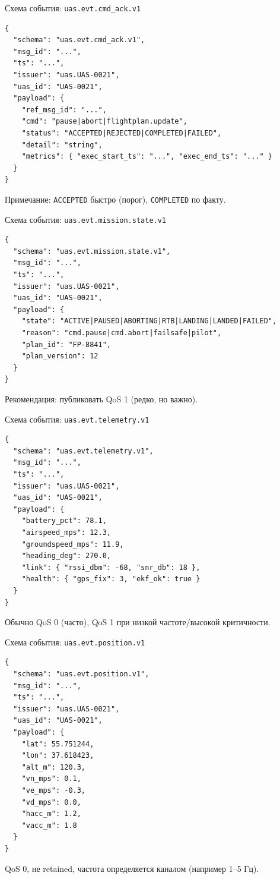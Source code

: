 \documentclass[aspectratio=169]{beamer}
\begin{document}
\begin{frame}{Схема события: \texttt{uas.evt.cmd\_ack.v1}}
\small
\begin{verbatim}
{
  "schema": "uas.evt.cmd_ack.v1",
  "msg_id": "...",
  "ts": "...",
  "issuer": "uas.UAS-0021",
  "uas_id": "UAS-0021",
  "payload": {
    "ref_msg_id": "...",
    "cmd": "pause|abort|flightplan.update",
    "status": "ACCEPTED|REJECTED|COMPLETED|FAILED",
    "detail": "string",
    "metrics": { "exec_start_ts": "...", "exec_end_ts": "..." }
  }
}
\end{verbatim}
Примечание: \texttt{ACCEPTED} быстро (порог), \texttt{COMPLETED} по факту.
\end{frame}

\begin{frame}{Схема события: \texttt{uas.evt.mission.state.v1}}
\small
\begin{verbatim}
{
  "schema": "uas.evt.mission.state.v1",
  "msg_id": "...",
  "ts": "...",
  "issuer": "uas.UAS-0021",
  "uas_id": "UAS-0021",
  "payload": {
    "state": "ACTIVE|PAUSED|ABORTING|RTB|LANDING|LANDED|FAILED",
    "reason": "cmd.pause|cmd.abort|failsafe|pilot",
    "plan_id": "FP-8841",
    "plan_version": 12
  }
}
\end{verbatim}
Рекомендация: публиковать QoS 1 (редко, но важно).
\end{frame}

\begin{frame}{Схема события: \texttt{uas.evt.telemetry.v1}}
\small
\begin{verbatim}
{
  "schema": "uas.evt.telemetry.v1",
  "msg_id": "...",
  "ts": "...",
  "issuer": "uas.UAS-0021",
  "uas_id": "UAS-0021",
  "payload": {
    "battery_pct": 78.1,
    "airspeed_mps": 12.3,
    "groundspeed_mps": 11.9,
    "heading_deg": 270.0,
    "link": { "rssi_dbm": -68, "snr_db": 18 },
    "health": { "gps_fix": 3, "ekf_ok": true }
  }
}
\end{verbatim}
Обычно QoS 0 (часто), QoS 1 при низкой частоте/высокой критичности.
\end{frame}

\begin{frame}{Схема события: \texttt{uas.evt.position.v1}}
\small
\begin{verbatim}
{
  "schema": "uas.evt.position.v1",
  "msg_id": "...",
  "ts": "...",
  "issuer": "uas.UAS-0021",
  "uas_id": "UAS-0021",
  "payload": {
    "lat": 55.751244,
    "lon": 37.618423,
    "alt_m": 120.3,
    "vn_mps": 0.1,
    "ve_mps": -0.3,
    "vd_mps": 0.0,
    "hacc_m": 1.2,
    "vacc_m": 1.8
  }
}
\end{verbatim}
QoS 0, не retained, частота определяется каналом (например 1--5 Гц).
\end{frame}
\end{document}
